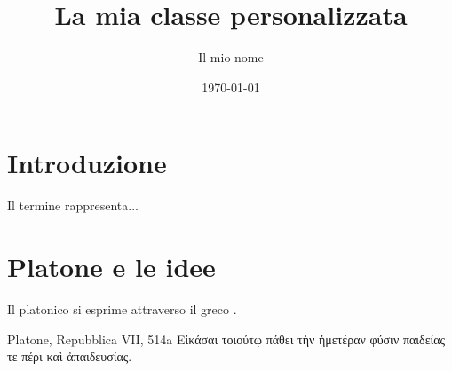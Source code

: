 \documentclass{gs}
\title{La mia classe personalizzata}
\author{Il mio nome}
\date{\today}
\begin{document}
\maketitle

\section{Introduzione}

Il termine  rappresenta...

\section{Platone e le idee}

Il  platonico si esprime attraverso il greco .

\begin{citazionefilosofica}{Platone, Repubblica VII, 514a}
Εἰκάσαι τοιούτῳ πάθει τὴν ἡμετέραν φύσιν παιδείας τε πέρι καὶ ἀπαιδευσίας.
\end{citazionefilosofica}
\end{document}
